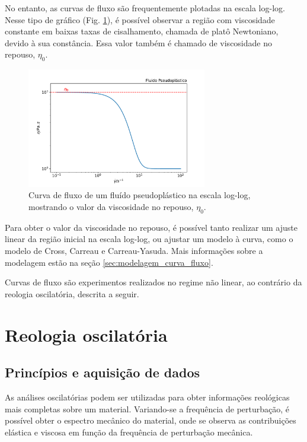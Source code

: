 			No entanto, as curvas de fluxo são frequentemente plotadas na escala log-log. Nesse tipo de gráfico (Fig. \ref{fig:reol_pseudoplastico_loglog}), é possível observar a região com viscosidade constante em baixas taxas de cisalhamento, chamada de platô Newtoniano, devido à sua constância. Essa valor também é chamado de viscosidade no repouso, \(\eta_0\).
			
			\begin{figure}[h]
				\centering
				\includegraphics[width=0.7\textwidth]{./imagens/reologia/Pseudoplastico_loglog}
				\caption{Curva de fluxo de um fluído pseudoplástico na escala log-log, mostrando o valor da viscosidade no repouso, \(\eta_0\).}
				\label{fig:reol_pseudoplastico_loglog}
			\end{figure}
		
			Para obter o valor da viscosidade no repouso, é possível tanto realizar um ajuste linear da região inicial na escala log-log, ou ajustar um modelo à curva, como o modelo de Cross, Carreau e Carreau-Yasuda. Mais informações sobre a modelagem estão na seção \ref{sec:modelagem_curva_fluxo}.
			
			Curvas de fluxo são experimentos realizados no regime não linear, ao contrário da reologia oscilatória, descrita a seguir. 
		\FloatBarrier

		\section{Reologia oscilatória} 
			\subsection{Princípios e aquisição de dados} 
			
			As análises oscilatórias podem ser utilizadas para obter informações reológicas mais completas sobre um material. Variando-se a frequência de perturbação, é possível obter o espectro mecânico do material, onde se observa as contribuições elástica e viscosa em função da frequência de perturbação mecânica.
			
